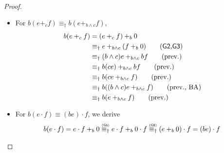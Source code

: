 \documentclass[orivec,envcountsect,envcountsame]{llncs}
\begin{document}
\begin{proof}
\begin{itemize}
\begin{align*}
			&\equiv_\dagger e +_{c \wedge b} (0 +_b 0) \tag{\textsf{G1}}\\
			&\equiv_\dagger (e +_c 0) +_b 0 \tag{\textsf{G3}}\\
			&= b(ce)
			\intertext{
                \item
				For $b(e +_c f) \equiv be +_c bf$, we derive:
			}
			b(e +_c f)
			&\equiv_\dagger ((b \vee \overline{c}) \wedge (b \vee c))(e +_c f) \tag{BA}\\
			&\equiv_\dagger (b \vee \overline{c})((b \vee c)(e +_c f)) \tag{prev.}\\
			&= (b \vee \overline{c})((e +_c f) +_{b \vee c} 0) \\
			&\equiv_\dagger (b \vee \overline{c})(e +_c (f +_b 0)) \tag{\textsf{G2},\textsf{G3}}\\
			&= (b \vee \overline{c})(e +_c bf) \\
			&= (e +_c bf) +_{b \vee \overline{c}} 0 \\
			&\equiv_\dagger (bf +_{\overline{c}} e) +_{b \vee \overline{c}} 0 \tag{\textsf{G2}}\\
			&\equiv_\dagger bf +_{\overline{c}} (e +_b 0) \tag{\textsf{G2},\textsf{G3}} \\
			&= bf +_{\overline{c}} be \\
			&\equiv_\dagger be +_{c} bf \tag{\textsf{G2}}
		\end{align*}

		\item For \(b(e +_c f) \equiv_\dagger b(e +_{b \wedge c} f)\),
		\begin{align*}
			b(e +_c f)
			&= (e +_c f) +_b 0 \\
			&\equiv_\dagger e +_{b\wedge c} (f +_b 0) \tag{\textsf{G2},\textsf{G3}}\\
			&\equiv_\dagger (b\wedge c)e +_{b\wedge c} bf \tag{prev.}\\
			&\equiv_\dagger b(ce) +_{b\wedge c} bf \tag{prev.}\\
			&\equiv_\dagger b(ce +_{b\wedge c} f) \tag{prev.}\\
			&\equiv_\dagger b((b\wedge c)e +_{b\wedge c} f) \tag{prev., BA}\\
			&\equiv_\dagger b(e +_{b\wedge c} f) \tag{prev.}
		\end{align*}

		\item
		For $b(e \cdot f) \equiv (be) \cdot f$, we derive
		\[
		b(e \cdot f)
		= e \cdot f +_b 0
		\stackrel{\text{\tiny(\textsf{G6})}}{\equiv_\dagger} e \cdot f +_b 0 \cdot f
		\stackrel{\text{\tiny(\textsf{G8})}}{\equiv_\dagger} (e +_b 0) \cdot f
		= (be) \cdot f
		\]


\end{itemize}
\end{proof}
\end{document}
